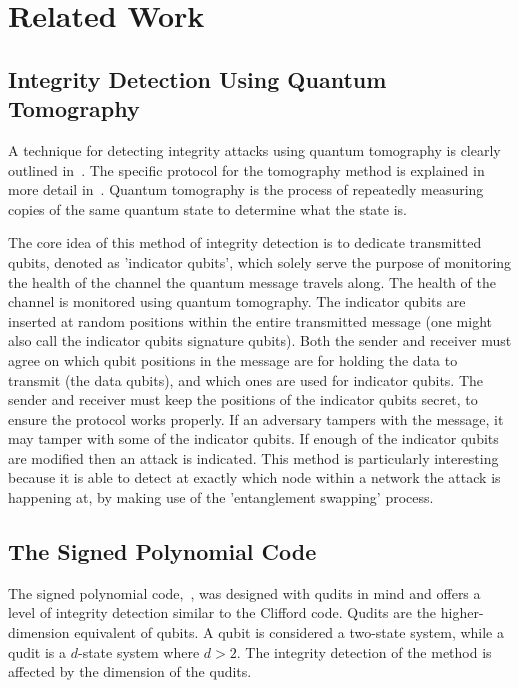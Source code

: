 \chapter{Related Work}
\label{sec:relatedWork}
\section{Integrity Detection Using Quantum Tomography}
\label{subsec:IntegrityDetectionUsingQuantumTomography}
A technique for detecting integrity attacks using quantum tomography is clearly outlined in~\cite{satoh2018network}. The specific protocol for the tomography method is explained in more detail in~\cite{oka2016classical}. Quantum tomography is the process of repeatedly measuring copies of the same quantum state to determine what the state is.

The core idea of this method of integrity detection is to dedicate transmitted qubits, denoted as 'indicator qubits', which solely serve the purpose of monitoring the health of the channel the quantum message travels along. The health of the channel is monitored using quantum tomography. The indicator qubits are inserted at random positions within the entire transmitted message (one might also call the indicator qubits signature qubits). Both the sender and receiver must agree on which qubit positions in the message are for holding the data to transmit (the data qubits), and which ones are used for indicator qubits. The sender and receiver must keep the positions of the indicator qubits secret, to ensure the protocol works properly. If an adversary tampers with the message, it may tamper with some of the indicator qubits. If enough of the indicator qubits are modified then an attack is indicated. This method is particularly interesting because it is able to detect at exactly which node within a network the attack is happening at, by making use of the 'entanglement swapping' process.
\section{The Signed Polynomial Code}
\label{section:signedPolynomialCode}
The signed polynomial code,~\cite{ben2006secure,aharonov2017interactive}, was designed with qudits in mind and offers a level of integrity detection similar to the Clifford code. Qudits are the higher-dimension equivalent of qubits. A qubit is considered a two-state system, while a qudit is a $d$-state system where $d > 2$. The integrity detection of the method is affected by the dimension of the qudits.
